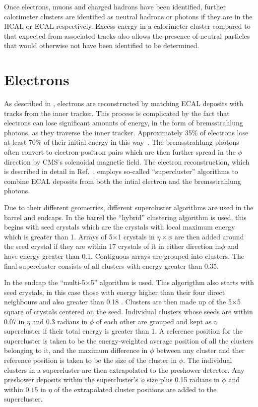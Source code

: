 Once electrons, muons and charged hadrons have been identified, further calorimeter clusters are identified as neutral hadrons or photons if they are in the \ac{HCAL} or \ac{ECAL} respectively. Excess energy in a calorimeter cluster compared to that expected from associated tracks also allows the presence of neutral particles that would otherwise not have been identified to be determined.

\section{Electrons}
\label{sec:electrons}
As described in , electrons are reconstructed by matching \ac{ECAL} deposits with tracks from the inner tracker. This process is complicated by the fact that electrons can lose significant amounts of energy, in the form of bremsstrahlung photons, as they traverse the inner tracker. Approximately 35\% of electrons lose at least 70\% of their initial energy in this way~\cite{Baffioni:2006cd}. The bremsstrahlung photons often convert to electron-positron pairs which are then further spread in the $\phi$ direction by CMS's solenoidal magnetic field. The electron reconstruction, which is described in detail in Ref.~\cite{1748-0221-10-06-P06005}, employs so-called ``supercluster'' algorithms to combine \ac{ECAL} deposits from both the intial electron and the bremsstrahlung photons.

Due to their different geometries, different supercluster algorithms are used in the barrel and endcaps. In the barrel the ``hybrid'' clustering algorithm is used, this begins with seed crystals which are the crystals with local maximum energy which is greater than 1\GeV. Arrays of 5$\times$1 crystals in $\eta\times\phi$ are then added around the seed crystal if they are within 17 crystals of it in either direction in$\phi$ and have energy greater than 0.1\GeV. Contiguous arrays are grouped into clusters. The final supercluster consists of all clusters with energy greater than 0.35\GeV.

In the endcap the ``multi-5$\times$5'' algorithm is used. This algorigthm also starts with seed crystals, in this case those with energy higher than their four direct neighbours and also greater than 0.18 \GeV. Clusters are then made up of the 5$\times$5 square of crystals centered on the seed. Individual clusters whose seeds are within 0.07 in $\eta$ and 0.3 radians in $\phi$ of each other are grouped and kept as a supercluster if their total energy is greater than 1\GeV. A reference position for the supercluster is taken to be the energy-weighted average position of all the clusters belonging to it, and the maximum difference in $\phi$ between any cluster and ther reference position is taken to be the size of the cluster in $\phi$. The individual clusters in a supercluster are then extrapolated to the preshower detector. Any preshower deposits within the supercluster's $\phi$ size plus 0.15 radians in $\phi$ and within $0.15$ in $\eta$ of the extrapolated cluster positions are added to the supercluster.

